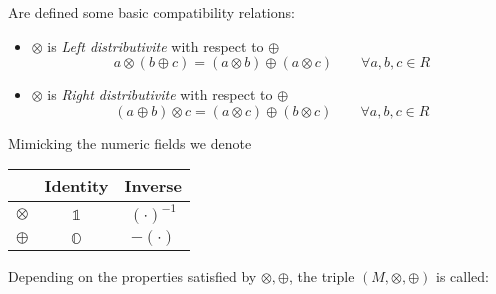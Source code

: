 \documentclass[a4paper,12pt]{scrartcl}    %
\newcommand{\OpA}{\otimes}
\newcommand{\OpB}{\oplus}
\begin{document}
Are defined some basic compatibility relations:
\begin{itemize}
\item $\OpA$ is \emph{Left distributivite} with respect to $\OpB$
	\begin{equation}\label{LeftDistributivity}
		a \OpA ( b \OpB c) = (a \OpA b) \OpB (a \OpA c) \qquad \forall a,b,c \in R
	\end{equation}
\item  $\OpA$ is \emph{Right distributivite} with respect to $\OpB$
	\begin{equation}\label{RightDistributivity}
		( a \OpB b)\OpA c = (a \OpA c) \OpB (b \OpA c) \qquad \forall a,b,c \in R	
	\end{equation}
\end{itemize}
\begin{notationfix}
	Mimicking the numeric fields we denote
	\begin{tabular}{|c|c c|}
		\hline 
			& Identity & Inverse \\
		\hline
		$\OpA$ & $\mathbb{1}$ & $(\cdot)^{-1}$\\
		$\OpB$ & $\mathbb{O}$ & $-(\cdot)$\\
		\hline
	\end{tabular}

\end{notationfix}

Depending on the properties satisfied by $\OpA,\OpB$, the triple $(M,\OpA,\OpB)$ is called:
\end{document}
